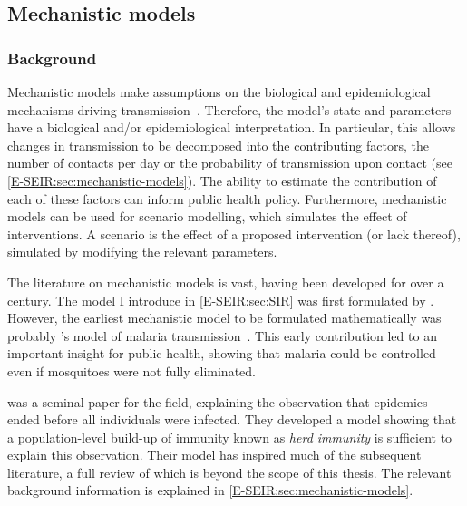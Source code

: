 \documentclass[thesis.tex]{subfiles}
\begin{document}
\subsection{Mechanistic models}

\subsubsection{Background}

Mechanistic models make assumptions on the biological and epidemiological mechanisms driving transmission~\autocite{lesslerMechanistic}.
Therefore, the model's state and parameters have a biological and/or epidemiological interpretation.
In particular, this allows changes in transmission to be decomposed into the contributing factors, \eg the number of contacts per day or the probability of transmission upon contact (see \cref{E-SEIR:sec:mechanistic-models}).
The ability to estimate the contribution of each of these factors can inform public health policy.
Furthermore, mechanistic models can be used for scenario modelling, which simulates the effect of interventions.
A scenario is the effect of a proposed intervention (or lack thereof), simulated by modifying the relevant parameters.

The literature on mechanistic models is vast, having been developed for over a century.
The model I introduce in \cref{E-SEIR:sec:SIR} was first formulated by \textcite{kermackContribution}.
However, the earliest mechanistic model to be formulated mathematically was probably \textcite{rossMalariaA}'s model of malaria transmission~\autocite{lesslerMechanistic}.
This early contribution led to an important insight for public health, showing that malaria could be controlled even if mosquitoes were not fully eliminated.

\Textcite{kermackContribution} was a seminal paper for the field, explaining the observation that epidemics ended before all individuals were infected.
They developed a model showing that a population-level build-up of immunity known as \emph{herd immunity} is sufficient to explain this observation.
Their model has inspired much of the subsequent literature, a full review of which is beyond the scope of this thesis.
The relevant background information is explained in \cref{E-SEIR:sec:mechanistic-models}.
\end{document}
